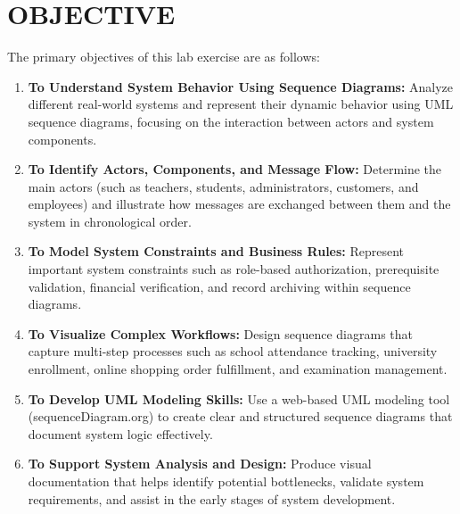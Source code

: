 \chapter{OBJECTIVE}\label{obj}

The primary objectives of this lab exercise are as follows:

\begin{enumerate}
    \item \textbf{To Understand System Behavior Using Sequence Diagrams:} Analyze different real-world systems and represent their dynamic behavior using UML sequence diagrams, focusing on the interaction between actors and system components.

    \item \textbf{To Identify Actors, Components, and Message Flow:} Determine the main actors (such as teachers, students, administrators, customers, and employees) and illustrate how messages are exchanged between them and the system in chronological order.

    \item \textbf{To Model System Constraints and Business Rules:} Represent important system constraints such as role-based authorization, prerequisite validation, financial verification, and record archiving within sequence diagrams.

    \item \textbf{To Visualize Complex Workflows:} Design sequence diagrams that capture multi-step processes such as school attendance tracking, university enrollment, online shopping order fulfillment, and examination management.

    \item \textbf{To Develop UML Modeling Skills:} Use a web-based UML modeling tool (sequenceDiagram.org) to create clear and structured sequence diagrams that document system logic effectively.

    \item \textbf{To Support System Analysis and Design:} Produce visual documentation that helps identify potential bottlenecks, validate system requirements, and assist in the early stages of system development.
\end{enumerate}

\clearpage